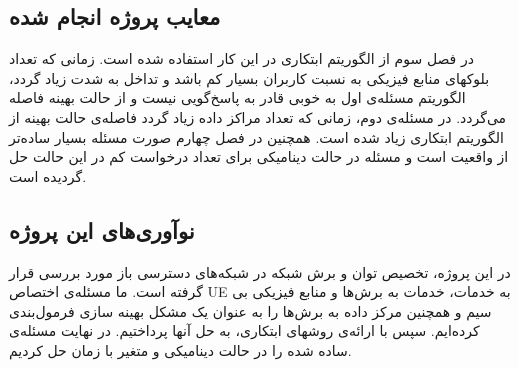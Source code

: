  \subsection{معایب  پروژه انجام شده}
 در فصل سوم از الگوریتم ابتکاری در این کار استفاده شده است. زمانی که تعداد بلوکهای منابع فیزیکی به نسبت کاربران بسیار کم باشد و تداخل به شدت زیاد گردد، الگوریتم مسئله‌ی اول به خوبی قادر به پاسخ‌گویی نیست و از حالت بهینه فاصله ‌می‌گردد. در مسئله‌ی دوم، زمانی که تعداد مراکز داده زیاد گردد فاصله‌ی حالت بهینه از الگوریتم ابتکاری زیاد شده است. 
همچنین در فصل چهارم صورت مسئله بسیار ساده‌تر از واقعیت است و مسئله در حالت دینامیکی برای تعداد درخواست کم در این حالت حل گردیده است.
 \subsection{نوآوری‌های این پروژه}
 در این پروژه، تخصیص توان و برش شبکه در شبکه‌های دسترسی باز مورد بررسی قرار گرفته است.
 ما مسئله‌ی اختصاص UE به خدمات، خدمات به برش‌ها و منابع فیزیکی بی سیم و همچنین مرکز داده به برش‌ها را به عنوان یک مشکل بهینه سازی فرمول‌بندی کرده‌ایم. سپس با ارائه‌ی روشهای ابتکاری، به حل آنها پرداختیم. در نهایت مسئله‌ی ساده شده را در حالت دینامیکی و متغیر با زمان حل کردیم.

